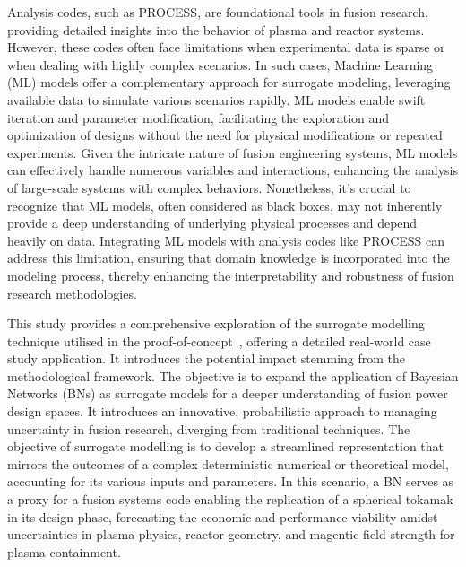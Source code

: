 \documentclass[journal]{IEEEtran}
\begin{document}
Analysis codes, such as PROCESS, are foundational tools in fusion research, providing detailed insights into the behavior of plasma and reactor systems. However, these codes often face limitations when experimental data is sparse or when dealing with highly complex scenarios. In such cases, Machine Learning (ML) models offer a complementary approach for surrogate modeling, leveraging available data to simulate various scenarios rapidly. ML models enable swift iteration and parameter modification, facilitating the exploration and optimization of designs without the need for physical modifications or repeated experiments. Given the intricate nature of fusion engineering systems, ML models can effectively handle numerous variables and interactions, enhancing the analysis of large-scale systems with complex behaviors. Nonetheless, it's crucial to recognize that ML models, often considered as black boxes, may not inherently provide a deep understanding of underlying physical processes and depend heavily on data. Integrating ML models with analysis codes like PROCESS can address this limitation, ensuring that domain knowledge is incorporated into the modeling process, thereby enhancing the interpretability and robustness of fusion research methodologies.

This study provides a comprehensive exploration of the surrogate modelling technique utilised in the proof-of-concept~\cite{Griffiths2024}, offering a detailed real-world case study application. It introduces the potential impact stemming from the methodological framework. The objective is to expand the application of Bayesian Networks (BNs) as surrogate models for a deeper understanding of fusion power design spaces. It introduces an innovative, probabilistic approach to managing uncertainty in fusion research, diverging from traditional techniques. The objective of surrogate modelling is to develop a streamlined representation that mirrors the outcomes of a complex deterministic numerical or theoretical model, accounting for its various inputs and parameters. In this scenario, a BN serves as a proxy for a fusion systems code enabling the replication of a spherical tokamak in its design phase, forecasting the economic and performance viability amidst uncertainties in plasma physics, reactor geometry, and magentic field strength for plasma containment.
\end{document}
